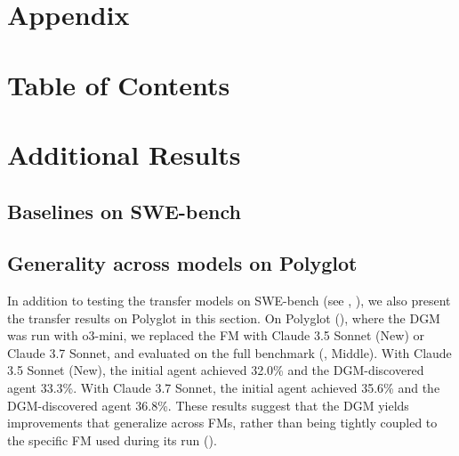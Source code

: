 
\section*{\LARGE Appendix}

\section*{Table of Contents}

\startcontents[sections]

\clearpage

\section{Additional Results}
\label{app:add-results}
\subsection{Baselines on SWE-bench}
\label{app:plots-swe}





\subsection{Generality across models on Polyglot}
\label{app:polyglot-model}



In addition to testing the transfer models on SWE-bench (see , ), we also present the transfer results on Polyglot in this section. On Polyglot (), where the DGM was run with o3-mini, we replaced the FM with Claude 3.5 Sonnet (New) or Claude 3.7 Sonnet, and evaluated on the full benchmark (, Middle). With Claude 3.5 Sonnet (New), the initial agent achieved 32.0\% and the DGM-discovered agent 33.3\%. With Claude 3.7 Sonnet, the initial agent achieved 35.6\% and the DGM-discovered agent 36.8\%. These results suggest that the DGM yields improvements that generalize across FMs, rather than being tightly coupled to the specific FM used during its run ().

